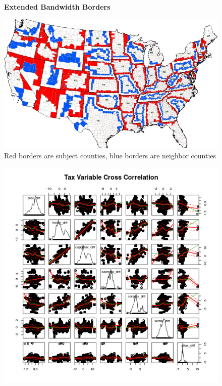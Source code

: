 \documentclass[12pt,a4paper]{article}
\begin{document}
\begin{figure}[h]
    \centering
    \textbf{Extended Bandwidth Borders}\par\medskip
    \includegraphics[scale = 0.5]{../analysis/output/eb_picture.png}
    \caption{Red borders are subject counties, blue borders are neighbor counties}
\end{figure}



\begin{figure}[h]\label{pairs}
    \centering
    \includegraphics[scale = 0.5]{../analysis/output/_--_pairs.png}
\end{figure}
\end{document}
